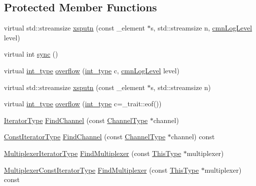 \subsection*{Protected Member Functions}
\begin{DoxyCompactItemize}
\item 
virtual std\+::streamsize \hyperlink{classcmn_l_o_d_multiplexer_streambuf_afd0e34593a849612cfdbb09f56d5376d}{xsputn} (const \+\_\+element $\ast$s, std\+::streamsize n, \hyperlink{cmn_log_lo_d_8h_a70c67165c37a0971e0dd1a85d4edaaae}{cmn\+Log\+Level} level)
\item 
virtual int \hyperlink{classcmn_l_o_d_multiplexer_streambuf_aa51aeb57da7090f3243b5b43c888ac9d}{sync} ()
\item 
virtual \hyperlink{classcmn_l_o_d_multiplexer_streambuf_a8d1eadc5cf72b594aa2c2fef6401fe47}{int\+\_\+type} \hyperlink{classcmn_l_o_d_multiplexer_streambuf_a95173de27f7abc67614838d79858c5bf}{overflow} (\hyperlink{classcmn_l_o_d_multiplexer_streambuf_a8d1eadc5cf72b594aa2c2fef6401fe47}{int\+\_\+type} c, \hyperlink{cmn_log_lo_d_8h_a70c67165c37a0971e0dd1a85d4edaaae}{cmn\+Log\+Level} level)
\item 
virtual std\+::streamsize \hyperlink{classcmn_l_o_d_multiplexer_streambuf_a143dfb4f86ab7f7b5e29bde48fae4bba}{xsputn} (const \+\_\+element $\ast$s, std\+::streamsize n)
\item 
virtual \hyperlink{classcmn_l_o_d_multiplexer_streambuf_a8d1eadc5cf72b594aa2c2fef6401fe47}{int\+\_\+type} \hyperlink{classcmn_l_o_d_multiplexer_streambuf_a9c6ee8fe5130932c795ab9f6ba707edd}{overflow} (\hyperlink{classcmn_l_o_d_multiplexer_streambuf_a8d1eadc5cf72b594aa2c2fef6401fe47}{int\+\_\+type} c=\+\_\+trait\+::eof())
\item 
\hyperlink{classcmn_l_o_d_multiplexer_streambuf_a32236d21fe0e9a13f4bea6ed743b0613}{Iterator\+Type} \hyperlink{classcmn_l_o_d_multiplexer_streambuf_a43509761f3e077378365b9071852eaf1}{Find\+Channel} (const \hyperlink{classcmn_l_o_d_multiplexer_streambuf_aa3b0347701c1aa5157a719978a1a6386}{Channel\+Type} $\ast$channel)
\item 
\hyperlink{classcmn_l_o_d_multiplexer_streambuf_ad60c91a0708ddcaf266d48f09d37bb63}{Const\+Iterator\+Type} \hyperlink{classcmn_l_o_d_multiplexer_streambuf_a3ed5f2e5714a17240ae469439da531a4}{Find\+Channel} (const \hyperlink{classcmn_l_o_d_multiplexer_streambuf_aa3b0347701c1aa5157a719978a1a6386}{Channel\+Type} $\ast$channel) const 
\item 
\hyperlink{classcmn_l_o_d_multiplexer_streambuf_addfaa1fedcd4e3b6df8e4020ec2cbde3}{Multiplexer\+Iterator\+Type} \hyperlink{classcmn_l_o_d_multiplexer_streambuf_a9af046b700b5984bb6df20dfe107e046}{Find\+Multiplexer} (const \hyperlink{classcmn_l_o_d_multiplexer_streambuf_aa50efd43cb53bb6be746e3990e02452a}{This\+Type} $\ast$multiplexer)
\item 
\hyperlink{classcmn_l_o_d_multiplexer_streambuf_a8c5b7460b364a24c760c4acaa6d6f042}{Multiplexer\+Const\+Iterator\+Type} \hyperlink{classcmn_l_o_d_multiplexer_streambuf_ab8c6ea404b8da54ee18f7972e640b46e}{Find\+Multiplexer} (const \hyperlink{classcmn_l_o_d_multiplexer_streambuf_aa50efd43cb53bb6be746e3990e02452a}{This\+Type} $\ast$multiplexer) const 
\end{DoxyCompactItemize}
